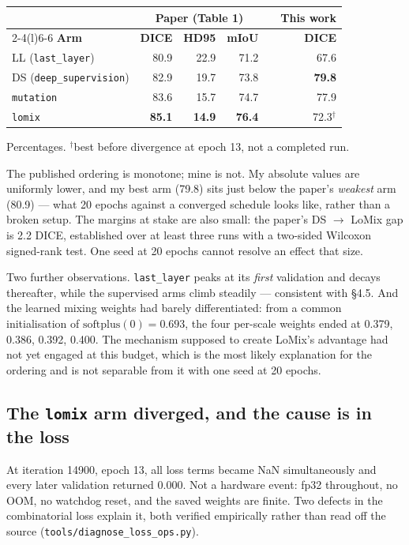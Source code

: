 \documentclass[11pt,a4paper]{article}
\newcommand{\code}[1]{\texttt{\small #1}}
\begin{document}
\begin{center}
\begin{tabular}{@{}lrrrcr@{}}
\toprule
& \multicolumn{3}{c}{\textbf{Paper (Table 1)}} & & \textbf{This work} \\
\cmidrule(lr){2-4}\cmidrule(l){6-6}
\textbf{Arm} & \textbf{DICE} & \textbf{HD95} & \textbf{mIoU} & & \textbf{DICE} \\
\midrule
LL (\code{last\_layer}) & 80.9 & 22.9 & 71.2 & & 67.6 \\
DS (\code{deep\_supervision}) & 82.9 & 19.7 & 73.8 & & \textbf{79.8} \\
\code{mutation} & 83.6 & 15.7 & 74.7 & & 77.9 \\
\code{lomix} & \textbf{85.1} & \textbf{14.9} & \textbf{76.4} & & 72.3$^\dagger$ \\
\bottomrule
\end{tabular}
\end{center}
{\small Percentages. $^\dagger$best before divergence at epoch 13, not a
completed run.}

The published ordering is monotone; mine is not. My absolute values are
uniformly lower, and my best arm (79.8) sits just below the paper's
\emph{weakest} arm (80.9) --- what 20 epochs against a converged schedule looks
like, rather than a broken setup. The margins at stake are also small: the
paper's DS $\rightarrow$ LoMix gap is 2.2 DICE, established over at least three
runs with a two-sided Wilcoxon signed-rank test. One seed at 20 epochs cannot
resolve an effect that size.

Two further observations. \code{last\_layer} peaks at its \emph{first}
validation and decays thereafter, while the supervised arms climb steadily --- consistent with
\S4.5. And the learned mixing weights had barely differentiated: from a common
initialisation of $\mathrm{softplus}(0) = 0.693$, the four per-scale weights
ended at 0.379, 0.386, 0.392, 0.400. The mechanism supposed to create LoMix's
advantage had not yet engaged at this budget, which is the most likely
explanation for the ordering and is not separable from it with one seed at 20
epochs.

\subsection{The \code{lomix} arm diverged, and the cause is in the loss}

At iteration 14900, epoch 13, all loss terms became NaN simultaneously and every
later validation returned 0.000. Not a hardware event: fp32 throughout, no OOM,
no watchdog reset, and the saved weights are finite. Two defects in the
combinatorial loss explain it, both verified empirically rather than read off
the source (\code{tools/diagnose\_loss\_ops.py}).
\end{document}
